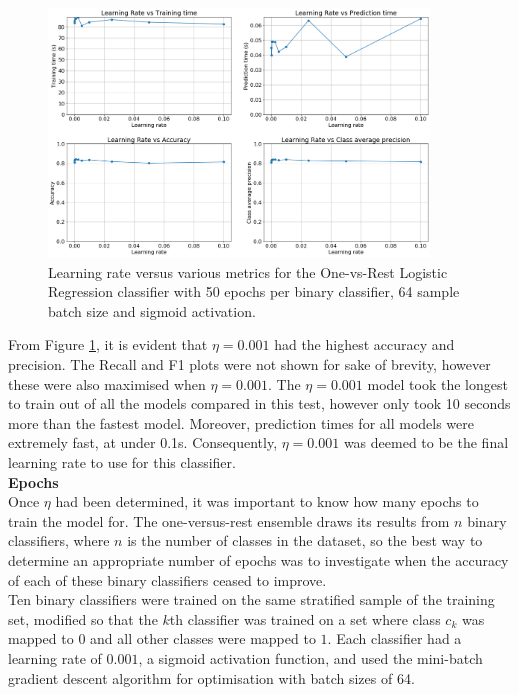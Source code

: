 \documentclass[11pt,a4paper]{article}
\begin{document}
\begin{figure}[H]
    \centering
    \includegraphics[width=0.9\textwidth]{img/lr_eta_test.png}
    \caption{Learning rate versus various metrics for the One-vs-Rest Logistic Regression classifier with 50 epochs per binary classifier, 64 sample batch size and sigmoid activation.}
    \label{fig:logistic_regression_eta_tuning}
\end{figure}

\noindent From Figure \ref{fig:logistic_regression_eta_tuning}, it is evident that $\eta = 0.001$ had the highest accuracy and precision. The Recall and F1 plots were not shown for sake of brevity, however these were also maximised when $\eta = 0.001$. The $\eta = 0.001$ model took the longest to train out of all the models compared in this test, however only took 10 seconds more than the fastest model. Moreover, prediction times for all models were extremely fast, at under 0.1s. Consequently, $\eta = 0.001$ was deemed to be the final learning rate to use for this classifier.\\

\noindent\textbf{Epochs}\\
Once $\eta$ had been determined, it was important to know how many epochs to train the model for. The one-versus-rest ensemble draws its results from $n$ binary classifiers, where $n$ is the number of classes in the dataset, so the best way to determine an appropriate number of epochs was to investigate when the accuracy of each of these binary classifiers ceased to improve.\\

\noindent Ten binary classifiers were trained on the same stratified sample of the training set, modified so that the $k$th classifier was trained on a set where class $c_k$ was mapped to $0$ and all other classes were mapped to $1$. Each classifier had a learning rate of $0.001$, a sigmoid activation function, and used the mini-batch gradient descent algorithm for optimisation with batch sizes of 64.\\
\end{document}
